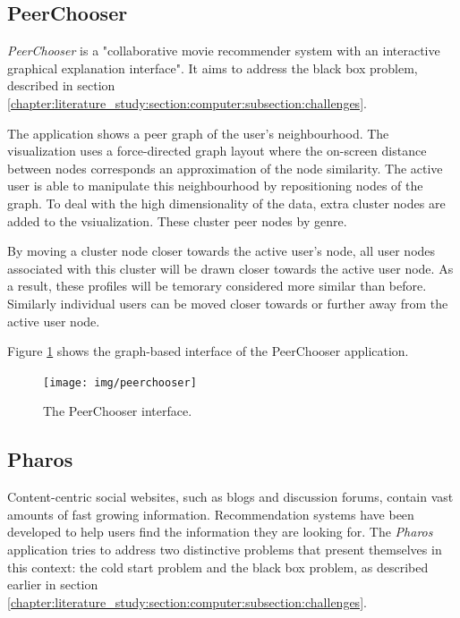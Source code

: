 \subsection{PeerChooser}\label{chapter:survey:section:applications:subsection:peerchooser}

\emph{PeerChooser} is a "collaborative movie recommender system with an interactive graphical explanation interface"\cite{odonovan:2008}. It aims to address the black box problem, described in section \ref{chapter:literature_study:section:computer:subsection:challenges}\cite{odonovan:2008}.

The application shows a peer graph of the user's neighbourhood. The visualization uses a force-directed graph layout where the on-screen distance between nodes corresponds an approximation of the node similarity. The active user is able to manipulate this neighbourhood by repositioning nodes of the graph. To deal with the high dimensionality of the data, extra cluster nodes are added to the vsiualization. These cluster peer nodes by genre\cite{odonovan:2008}.

By moving a cluster node closer towards the active user's node, all user nodes associated with this cluster will be drawn closer towards the active user node. As a result, these profiles will be temorary considered more similar than before. Similarly individual users can be moved closer towards or further away from the active user node\cite{odonovan:2008}.

Figure \ref{figure:peerchooser} shows the graph-based interface of the PeerChooser application.

\begin{figure}%
	\begin{center}
		\texttt{[image: img/peerchooser]}%
	\end{center}
	\caption{The PeerChooser interface.}%
	\label{figure:peerchooser}%
\end{figure}



\subsection{Pharos}\label{chapter:survey:section:applications:subsection:pharos}

Content-centric social websites, such as blogs and discussion forums, contain vast amounts of fast growing information. Recommendation systems have been developed to help users find the information they are looking for. The \emph{Pharos} application tries to address two distinctive problems that present themselves in this context: the cold start problem and the black box problem\cite{zhao:2010}, as described earlier in section \ref{chapter:literature_study:section:computer:subsection:challenges}.

